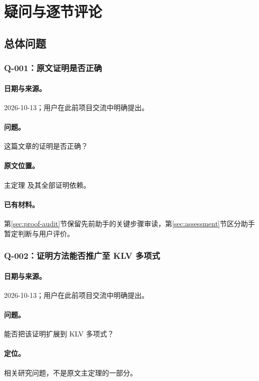 \section{疑问与逐节评论}\label{sec:comments}

\subsection{总体问题}
\subsubsection*{Q-001：原文证明是否正确}\label{question:correctness}
\paragraph{日期与来源。}2026-10-13；用户在此前项目交流中明确提出。
\paragraph{问题。}这篇文章的证明是否正确？
\paragraph{原文位置。}主定理  及其全部证明依赖。
\paragraph{已有材料。}第\ref{sec:proof-audit}节保留先前助手的关键步骤审读，第\ref{sec:assessment}节区分助手暂定判断与用户评价。

\subsubsection*{Q-002：证明方法能否推广至 KLV 多项式}\label{question:klv}
\paragraph{日期与来源。}2026-10-13；用户在此前项目交流中明确提出。
\paragraph{问题。}能否把该证明扩展到 KLV 多项式？
\paragraph{定位。}相关研究问题，不是原文主定理的一部分。

